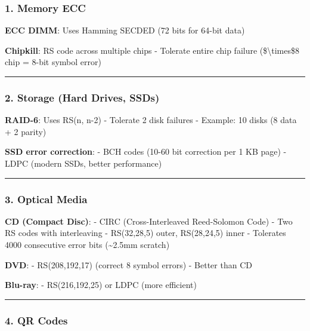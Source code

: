 \subsubsection{1. Memory ECC}\label{memory-ecc}

\textbf{ECC DIMM}: Uses Hamming SECDED (72 bits for 64-bit data)

\textbf{Chipkill}: RS code across multiple chips - Tolerate entire chip
failure (\$\textbackslash times\$8 chip = 8-bit symbol error)

\begin{center}\rule{0.5\linewidth}{0.5pt}\end{center}

\subsubsection{2. Storage (Hard Drives,
SSDs)}\label{storage-hard-drives-ssds}

\textbf{RAID-6}: Uses RS(n, n-2) - Tolerate 2 disk failures - Example:
10 disks (8 data + 2 parity)

\textbf{SSD error correction}: - BCH codes (10-60 bit correction per 1
KB page) - LDPC (modern SSDs, better performance)

\begin{center}\rule{0.5\linewidth}{0.5pt}\end{center}

\subsubsection{3. Optical Media}\label{optical-media}

\textbf{CD (Compact Disc)}: - CIRC (Cross-Interleaved Reed-Solomon Code)
- Two RS codes with interleaving - RS(32,28,5) outer, RS(28,24,5) inner
- Tolerates 4000 consecutive error bits (\textasciitilde2.5mm scratch)

\textbf{DVD}: - RS(208,192,17) (correct 8 symbol errors) - Better than
CD

\textbf{Blu-ray}: - RS(216,192,25) or LDPC (more efficient)

\begin{center}\rule{0.5\linewidth}{0.5pt}\end{center}

\subsubsection{4. QR Codes}\label{qr-codes}

